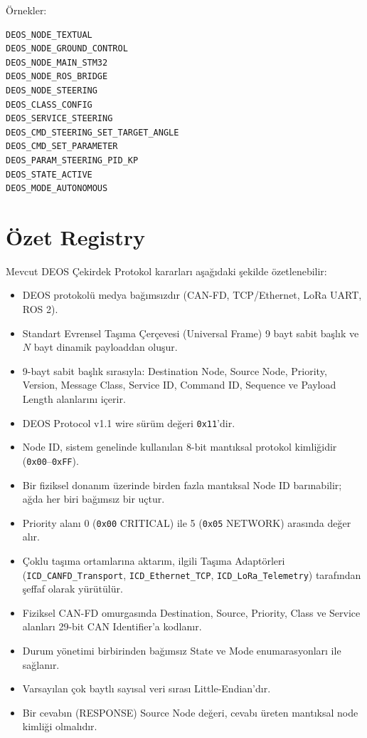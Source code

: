 \documentclass[a4paper,10pt]{article}
\newcommand{\hex}[1]{\texttt{0x#1}}
\newcommand{\code}[1]{\texttt{#1}}
\begin{document}
Örnekler:

\begin{verbatim}
DEOS_NODE_TEXTUAL
DEOS_NODE_GROUND_CONTROL
DEOS_NODE_MAIN_STM32
DEOS_NODE_ROS_BRIDGE
DEOS_NODE_STEERING
DEOS_CLASS_CONFIG
DEOS_SERVICE_STEERING
DEOS_CMD_STEERING_SET_TARGET_ANGLE
DEOS_CMD_SET_PARAMETER
DEOS_PARAM_STEERING_PID_KP
DEOS_STATE_ACTIVE
DEOS_MODE_AUTONOMOUS
\end{verbatim}


\section{Özet Registry}

Mevcut DEOS Çekirdek Protokol kararları aşağıdaki şekilde özetlenebilir:

\begin{itemize}
    \item DEOS protokolü medya bağımsızdır (CAN-FD, TCP/Ethernet, LoRa UART, ROS 2).
    \item Standart Evrensel Taşıma Çerçevesi (Universal Frame) 9 bayt sabit başlık ve $N$ bayt dinamik payloaddan oluşur.
    \item 9-bayt sabit başlık sırasıyla: Destination Node, Source Node, Priority, Version, Message Class, Service ID, Command ID, Sequence ve Payload Length alanlarını içerir.
    \item DEOS Protocol v1.1 wire sürüm değeri \hex{11}'dir.
    \item Node ID, sistem genelinde kullanılan 8-bit mantıksal protokol kimliğidir (\hex{00}--\hex{FF}).
    \item Bir fiziksel donanım üzerinde birden fazla mantıksal Node ID barınabilir; ağda her biri bağımsız bir uçtur.
    \item Priority alanı 0 (\hex{00} CRITICAL) ile 5 (\hex{05} NETWORK) arasında değer alır.
    \item Çoklu taşıma ortamlarına aktarım, ilgili Taşıma Adaptörleri (\code{ICD\_CANFD\_Transport}, \code{ICD\_Ethernet\_TCP}, \code{ICD\_LoRa\_Telemetry}) tarafından şeffaf olarak yürütülür.
    \item Fiziksel CAN-FD omurgasında Destination, Source, Priority, Class ve Service alanları 29-bit CAN Identifier'a kodlanır.
    \item Durum yönetimi birbirinden bağımsız State ve Mode enumarasyonları ile sağlanır.
    \item Varsayılan çok baytlı sayısal veri sırası Little-Endian'dır.
    \item Bir cevabın (RESPONSE) Source Node değeri, cevabı üreten mantıksal node kimliği olmalıdır.
\end{itemize}
\end{document}
